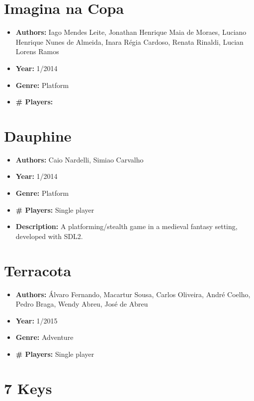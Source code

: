\begin{apendicesenv}
\section{Imagina na Copa}
\label {sec:imagina}

\begin{itemize}
\item[] \textbf{Authors:} Iago Mendes Leite, Jonathan Henrique Maia de Moraes, Luciano Henrique Nunes de Almeida, Inara Régia Cardoso, Renata Rinaldi, Lucian Lorens Ramos
\item[] \textbf{Year:} 1/2014
\item[] \textbf{Genre:} Platform
\item[] \textbf{\# Players:}
\end{itemize}

\section{Dauphine}
\label {sec:dauphine}

\begin{itemize}
\item[] \textbf{Authors:} Caio Nardelli, Simiao Carvalho
\item[] \textbf{Year:} 1/2014
\item[] \textbf{Genre:} Platform
\item[] \textbf{\# Players:} Single player
\item[] \textbf{Description:} A platforming/stealth game in a medieval fantasy setting, developed with SDL2.
\end{itemize}


\section{Terracota}
\label {sec:terracota}

\begin{itemize}
\item[] \textbf{Authors:} Álvaro Fernando, Macartur Sousa, Carlos Oliveira, André Coelho, Pedro Braga, Wendy Abreu, José de Abreu
\item[] \textbf{Year:} 1/2015
\item[] \textbf{Genre:} Adventure
\item[] \textbf{\# Players:} Single player
\end{itemize}

\section{7 Keys}
\label {sec:seven_keys}


\end{apendicesenv}
